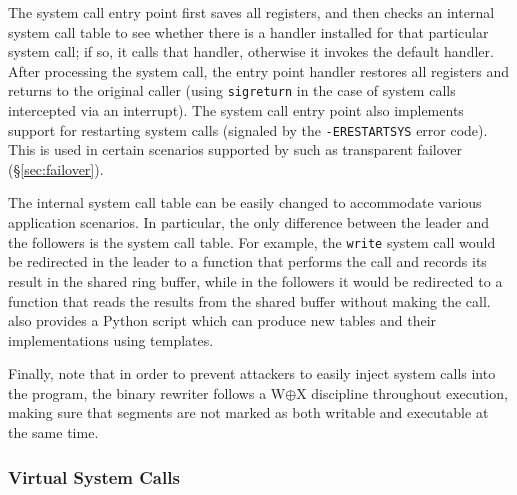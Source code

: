 The system call entry point first saves all registers, and then checks
an internal system call table to see whether there is a 
handler installed for that particular system call; if so, it calls
that handler, %
otherwise it
invokes the default handler.  After processing the system call, the
entry point handler restores all registers and returns to the original
caller (using \lstinline`sigreturn` in the case of system calls intercepted
via an interrupt). The system call entry point also implements support
for restarting system calls %
(\ie signaled by the \lstinline`-ERESTARTSYS` error code). This is used in
certain scenarios supported by \varan such as transparent failover
(\S\ref{sec:failover}).

The internal system call table can be easily changed to accommodate
various application scenarios.  In particular, the only difference
between the leader and the followers is the system call table. For
example, the \lstinline`write` system call would be redirected in the leader
to a function that performs the call and records its result in the
shared ring buffer, while in the followers it would be redirected to a
function that reads the results from the shared buffer without making
the call.
\varan  also provides a Python script which can produce new tables
and their implementations using templates.

Finally, note that in order to prevent attackers to easily inject
system calls into the program, the binary rewriter follows a
W$\mathbin{\oplus}$X discipline throughout execution, making sure that
segments are not marked as both writable and executable at the same
time.


\subsubsection{Virtual System Calls}
\label{sec:vsyscall}

